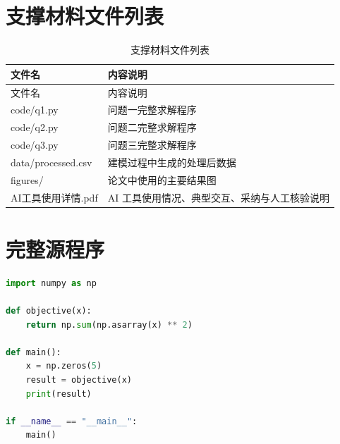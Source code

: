 \documentclass[UTF8,fontset=none,a4paper,12pt]{ctexart}
\begin{document}

\clearpage
\appendix

\section{支撑材料文件列表}

\begin{longtable}{p{}p{}}
  \caption{支撑材料文件列表}\label{tab:support-files}\\
  \toprule
  文件名 & 内容说明 \\
  \midrule
  \endfirsthead

  \toprule
  文件名 & 内容说明 \\
  \midrule
  \endhead

  code/q1.py & 问题一完整求解程序 \\
  code/q2.py & 问题二完整求解程序 \\
  code/q3.py & 问题三完整求解程序 \\
  data/processed.csv & 建模过程中生成的处理后数据 \\
  figures/ & 论文中使用的主要结果图 \\
  AI工具使用详情.pdf & AI 工具使用情况、典型交互、采纳与人工核验说明 \\
  \bottomrule
\end{longtable}


\section{完整源程序}

%
%

\begin{lstlisting}[language=Python,caption={问题一完整程序示例},label={code:q1}]
import numpy as np

def objective(x):
    return np.sum(np.asarray(x) ** 2)

def main():
    x = np.zeros(5)
    result = objective(x)
    print(result)

if __name__ == "__main__":
    main()
\end{lstlisting}
\end{document}
